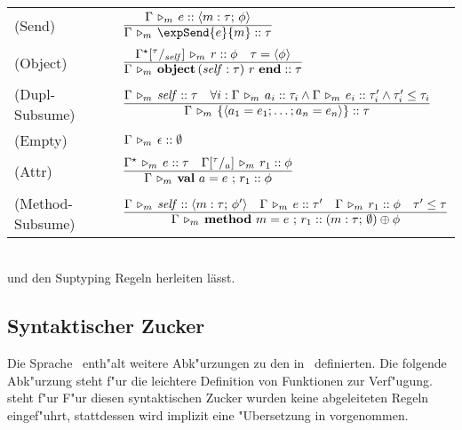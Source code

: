      \begin{tabular}{ll}
    \mbox{(Send)\ }         & $\RULE{\Tjm{\Gamma}{e}{\typeObject{\rtypeMethod{m}{\tau}{\phi}}}}
                              {\Tjm{\Gamma}{\expSend{e}{m}}{\tau}}$ \\[4mm]
    \mbox{(Object)\ }       & $\RULE{\Tjm{\Gamma^\star\SUB{\tau}{\self}}{r}{\phi}
                               \quad
                               \tau = \typeObject{\phi}}
                              {\Tjm{\Gamma}{\expObject{\self:\tau}{r}}{\tau}}$ \\[4mm]
    \mbox{(Dupl-Subsume)\ } & $\RULE{\Tjm{\Gamma}{\self}{\tau}
                               \quad
                               \forall i:\Tjm{\Gamma}{a_i}{\tau_i}
                                             \wedge \Tjm{\Gamma}{e_i}{\tau_i'}
                                             \wedge \tau_i' \le \tau_i}
                              {\Tjm{\Gamma}{\expDupl{a_1=e_1;\ldots;a_n=e_n}}{\tau}}$\\[4mm]
    \mbox{(Empty)\ }          & $\Gamma\,\triangleright_m\,\epsilon\mathrel{::}\emptyset$ \\[2mm]
    \mbox{(Attr)\ }           & $\RULE{\Tjm{\Gamma^\star}{e}{\tau}
                                 \quad
                                 \Tjm{\Gamma\SUB{\tau}{a}}{r_1}{\phi}}
                                {\Tjm{\Gamma}{\rowVal{a}{e}{r_1}}{\phi}}$ \\[4mm]
    \mbox{(Method-Subsume)\ } & $\RULE{\Tjm{\Gamma}{\self}{\typeObject{\rtypeMethod{m}{\tau}{\phi'}}}
                                 \quad
                                 \Tjm{\Gamma}{e}{\tau'}
                                 \quad
                                 \Tjm{\Gamma}{r_1}{\phi}
                                 \quad
                                 \tau' \le \tau}
                                {\Tjm{\Gamma}{\rowMethod{m}{e}{r_1}}
                                             {(\rtypeMethod{m}{\tau}{\rtypeEmpty}) \oplus \phi}}$
  \end{tabular} \\[7mm]
  und den Suptyping Regeln herleiten l\"asst.


\subsection{Syntaktischer Zucker}

Die Sprache \LTWOO\ enth"alt weitere Abk"urzungen zu den in \LTWO\ definierten. Die folgende Abk"urzung steht f"ur die leichtere Definition von Funktionen zur Verf"ugung.
\beqns
\eeqns
steht f"ur
\beqns
\eeqns
F"ur diesen syntaktischen Zucker wurden keine abgeleiteten Regeln eingef"uhrt, stattdessen wird implizit
eine "Ubersetzung in  vorgenommen.

